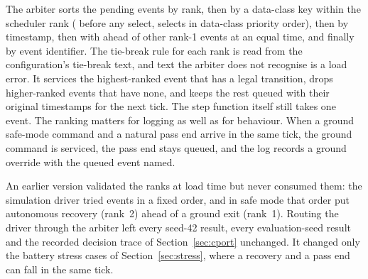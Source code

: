 \documentclass[preprint,12pt]{elsarticle}
\begin{document}
\begin{table}[t]
\centering
\small
\caption{Event conflict-resolution ranks shared by the three configurations.}
\label{tab:conflict}
\end{table}

The arbiter sorts the pending events by rank, then by a data-class key within the scheduler rank ( before any select, selects in data-class priority order), then by timestamp, then with  ahead of other rank-1 events at an equal time, and finally by event identifier. The tie-break rule for each rank is read from the configuration's tie-break text, and text the arbiter does not recognise is a load error. It services the highest-ranked event that has a legal transition, drops higher-ranked events that have none, and keeps the rest queued with their original timestamps for the next tick. The step function itself still takes one event. The ranking matters for logging as well as for behaviour. When a ground safe-mode command and a natural pass end arrive in the same tick, the ground command is serviced, the pass end stays queued, and the log records a ground override with the queued event named.

An earlier version validated the ranks at load time but never consumed them: the simulation driver tried events in a fixed order, and in safe mode that order put autonomous recovery (rank~2) ahead of a ground exit (rank~1). Routing the driver through the arbiter left every seed-42 result, every evaluation-seed result and the recorded decision trace of Section~\ref{sec:cport} unchanged. It changed only the battery stress cases of Section~\ref{sec:stress}, where a recovery and a pass end can fall in the same tick.
\end{document}
